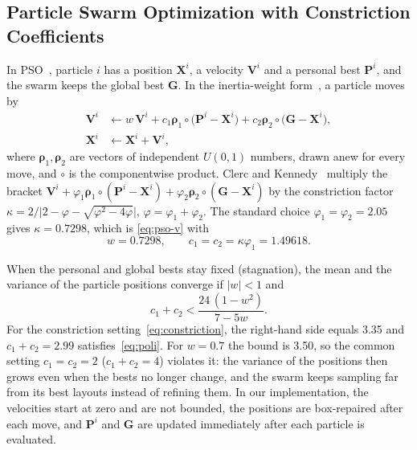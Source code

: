 \documentclass[journal,twoside]{IEEEtran}
\begin{document}
\subsection{Particle Swarm Optimization with Constriction Coefficients}
\label{sec:pso}
In PSO~\cite{Kennedy1995}, particle $i$ has a position $\mathbf X^i$, a velocity $\mathbf V^i$ and a personal best $\mathbf P^i$, and the swarm keeps the global best $\mathbf G$. In the inertia-weight form~\cite{Shi1998}, a particle moves by
\begin{align}
\mathbf V^i&\leftarrow w\,\mathbf V^i+c_1\boldsymbol\rho_1\circ\bigl(\mathbf P^i-\mathbf X^i\bigr)+c_2\boldsymbol\rho_2\circ\bigl(\mathbf G-\mathbf X^i\bigr),\label{eq:pso-v}\\
\mathbf X^i&\leftarrow\mathbf X^i+\mathbf V^i,\label{eq:pso-x}
\end{align}
where $\boldsymbol\rho_1,\boldsymbol\rho_2$ are vectors of independent $U(0,1)$ numbers, drawn anew for every move, and $\circ$ is the componentwise product. Clerc and Kennedy~\cite{Clerc2002} multiply the bracket $\mathbf V^i+\varphi_1\boldsymbol\rho_1\circ(\mathbf P^i-\mathbf X^i)+\varphi_2\boldsymbol\rho_2\circ(\mathbf G-\mathbf X^i)$ by the constriction factor $\kappa=2/\lvert2-\varphi-\sqrt{\varphi^2-4\varphi}\rvert$, $\varphi=\varphi_1+\varphi_2$. The standard choice $\varphi_1=\varphi_2=2.05$ gives $\kappa=0.7298$, which is \eqref{eq:pso-v} with
\begin{equation}
w=0.7298,\qquad c_1=c_2=\kappa\varphi_1=1.49618 .
\label{eq:constriction}
\end{equation}

When the personal and global bests stay fixed (stagnation), the mean and the variance of the particle positions converge if $\lvert w\rvert<1$ and~\cite{Poli2009}
\begin{equation}
c_1+c_2<\frac{24\,(1-w^2)}{7-5w}.
\label{eq:poli}
\end{equation}
For the constriction setting~\eqref{eq:constriction}, the right-hand side equals 3.35 and $c_1+c_2=2.99$ satisfies~\eqref{eq:poli}. For $w=0.7$ the bound is 3.50, so the common setting $c_1=c_2=2$ ($c_1+c_2=4$) violates it: the variance of the positions then grows even when the bests no longer change, and the swarm keeps sampling far from its best layouts instead of refining them. In our implementation, the velocities start at zero and are not bounded, the positions are box-repaired after each move, and $\mathbf P^i$ and $\mathbf G$ are updated immediately after each particle is evaluated.
\end{document}
